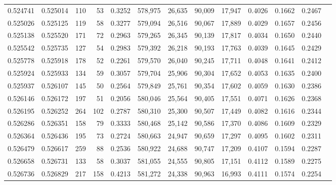 \begin{tabular}{rrrrrrrrrrrrr}
0.524741 & 0.525014 &   110 &    53 &                                     0.3252 & 578,975 &  26,635 &  90,009 &  17,947 & 0.4026 & 0.1662 & 0.2467 \\
0.525026 & 0.525125 &   119 &    58 &                                     0.3277 & 579,094 &  26,516 &  90,067 &  17,889 & 0.4029 & 0.1657 & 0.2456 \\
0.525138 & 0.525520 &   171 &    72 &                                     0.2963 & 579,265 &  26,345 &  90,139 &  17,817 & 0.4034 & 0.1650 & 0.2440 \\
0.525542 & 0.525735 &   127 &    54 &                                     0.2983 & 579,392 &  26,218 &  90,193 &  17,763 & 0.4039 & 0.1645 & 0.2429 \\
0.525778 & 0.525918 &   178 &    52 &                                     0.2261 & 579,570 &  26,040 &  90,245 &  17,711 & 0.4048 & 0.1641 & 0.2412 \\
0.525924 & 0.525933 &   134 &    59 &                                     0.3057 & 579,704 &  25,906 &  90,304 &  17,652 & 0.4053 & 0.1635 & 0.2400 \\
0.525937 & 0.526107 &   145 &    50 &                                     0.2564 & 579,849 &  25,761 &  90,354 &  17,602 & 0.4059 & 0.1630 & 0.2386 \\
0.526146 & 0.526172 &   197 &    51 &                                     0.2056 & 580,046 &  25,564 &  90,405 &  17,551 & 0.4071 & 0.1626 & 0.2368 \\
0.526195 & 0.526252 &   264 &   102 &                                     0.2787 & 580,310 &  25,300 &  90,507 &  17,449 & 0.4082 & 0.1616 & 0.2344 \\
0.526286 & 0.526351 &   158 &    79 &                                     0.3333 & 580,468 &  25,142 &  90,586 &  17,370 & 0.4086 & 0.1609 & 0.2329 \\
0.526364 & 0.526436 &   195 &    73 &                                     0.2724 & 580,663 &  24,947 &  90,659 &  17,297 & 0.4095 & 0.1602 & 0.2311 \\
0.526479 & 0.526617 &   259 &    88 &                                     0.2536 & 580,922 &  24,688 &  90,747 &  17,209 & 0.4107 & 0.1594 & 0.2287 \\
0.526658 & 0.526731 &   133 &    58 &                                     0.3037 & 581,055 &  24,555 &  90,805 &  17,151 & 0.4112 & 0.1589 & 0.2275 \\
0.526736 & 0.526829 &   217 &   158 &                                     0.4213 & 581,272 &  24,338 &  90,963 &  16,993 & 0.4111 & 0.1574 & 0.2254 \\

\end{tabular}
